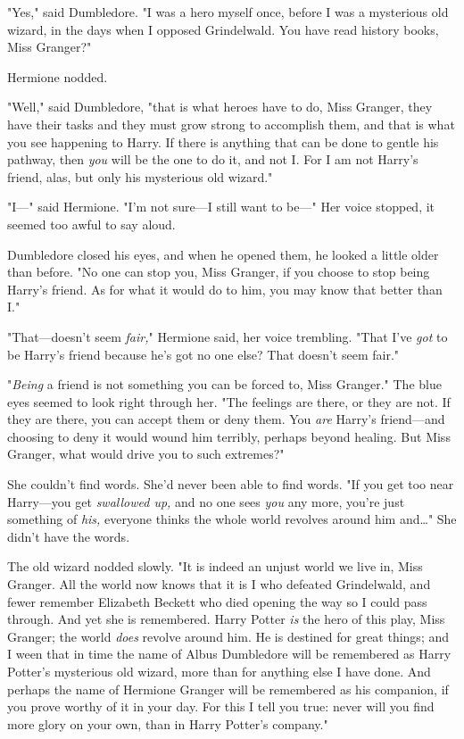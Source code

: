 "Yes," said Dumbledore. "I was a hero myself once, before I was a mysterious
old wizard, in the days when I opposed Grindelwald. You have read history
books, Miss Granger?"

Hermione nodded.

"Well," said Dumbledore, "that is what heroes have to do, Miss Granger, they
have their tasks and they must grow strong to accomplish them, and that is what
you see happening to Harry. If there is anything that can be done to gentle his
pathway, then \emph{you} will be the one to do it, and not I. For I am not
Harry's friend, alas, but only his mysterious old wizard."

"I---" said Hermione. "I'm not sure---I still want to be---" Her voice stopped,
it seemed too awful to say aloud.

Dumbledore closed his eyes, and when he opened them, he looked a little older
than before. "No one can stop you, Miss Granger, if you choose to stop being
Harry's friend. As for what it would do to him, you may know that better than
I."

"That---doesn't seem \emph{fair,}" Hermione said, her voice trembling. "That
I've \emph{got} to be Harry's friend because he's got no one else? That doesn't
seem fair."

"\emph{Being} a friend is not something you can be forced to, Miss Granger."
The blue eyes seemed to look right through her. "The feelings are there, or
they are not. If they are there, you can accept them or deny them. You
\emph{are} Harry's friend---and choosing to deny it would wound him terribly,
perhaps beyond healing. But Miss Granger, what would drive you to such
extremes?"

She couldn't find words. She'd never been able to find words. "If you get too
near Harry---you get \emph{swallowed up,} and no one sees \emph{you} any more,
you're just something of \emph{his,} everyone thinks the whole world revolves
around him and{\ldots}" She didn't have the words.

The old wizard nodded slowly. "It is indeed an unjust world we live in, Miss
Granger. All the world now knows that it is I who defeated Grindelwald, and
fewer remember Elizabeth Beckett who died opening the way so I could pass
through. And yet she is remembered. Harry Potter \emph{is} the hero of this
play, Miss Granger; the world \emph{does} revolve around him. He is destined
for great things; and I ween that in time the name of Albus Dumbledore will be
remembered as Harry Potter's mysterious old wizard, more than for anything else
I have done. And perhaps the name of Hermione Granger will be remembered as his
companion, if you prove worthy of it in your day. For this I tell you true:
never will you find more glory on your own, than in Harry Potter's company."

